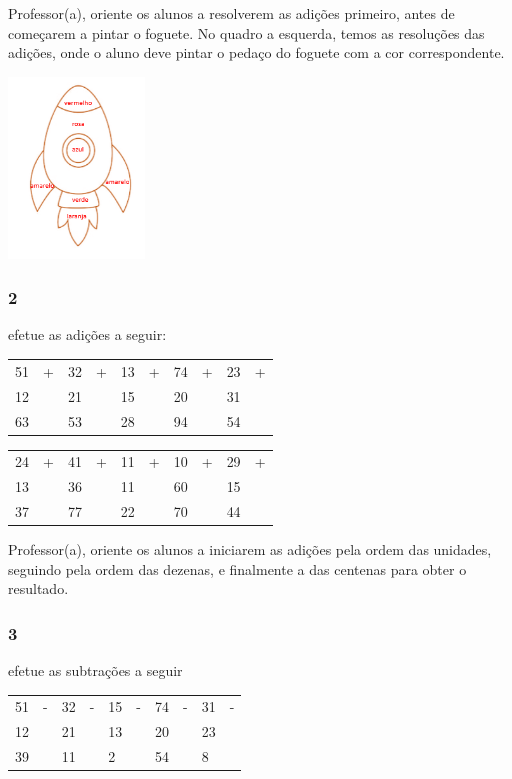 Professor(a), oriente os alunos a resolverem as adições primeiro, antes
de começarem a pintar o foguete. No quadro a esquerda, temos as
resoluções das adições, onde o aluno deve pintar o pedaço do foguete com
a cor correspondente.

\includegraphics[width=1.43098in,height=1.89472in]{media/image16.png}

\subsubsection{2}\label{section-9}

efetue as adições a seguir:

\begin{longtable}[]{@{}llllllllll@{}}
\toprule
51 & + & 32 & + & 13 & + & 74 & + & 23 & +\tabularnewline
12 & & 21 & & 15 & & 20 & & 31 &\tabularnewline
63 & & 53 & & 28 & & 94 & & 54 &\tabularnewline
\bottomrule
\end{longtable}

\begin{longtable}[]{@{}llllllllll@{}}
\toprule
24 & + & 41 & + & 11 & + & 10 & + & 29 & +\tabularnewline
13 & & 36 & & 11 & & 60 & & 15 &\tabularnewline
37 & & 77 & & 22 & & 70 & & 44 &\tabularnewline
\bottomrule
\end{longtable}

Professor(a), oriente os alunos a iniciarem as adições pela ordem das
unidades, seguindo pela ordem das dezenas, e finalmente a das centenas
para obter o resultado.

\subsubsection{3}\label{section-10}

efetue as subtrações a seguir

\begin{longtable}[]{@{}llllllllll@{}}
\toprule
51 & - & 32 & - & 15 & - & 74 & - & 31 & -\tabularnewline
12 & & 21 & & 13 & & 20 & & 23 &\tabularnewline
39 & & 11 & & 2 & & 54 & & 8 &\tabularnewline
\bottomrule
\end{longtable}

